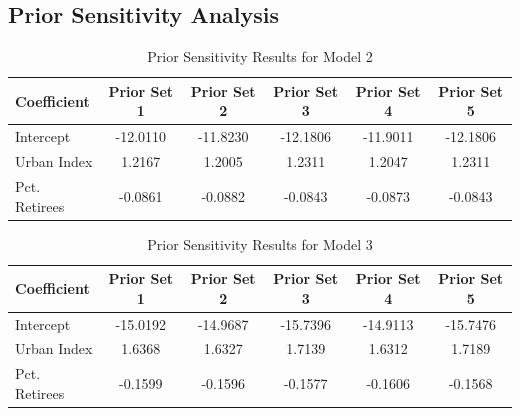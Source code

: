 \documentclass[12pt]{article}
\begin{document}
\FloatBarrier
\subsection*{Prior Sensitivity Analysis}
\begin{table}[h]
    \centering
    \begin{tabular}{l|ccccc}
        \hline
        Coefficient    & Prior Set 1 & Prior Set 2 & Prior Set 3 & Prior Set 4 & Prior Set 5 \\
        \hline
        Intercept      & -12.0110 & -11.8230 & -12.1806 & -11.9011 & -12.1806 \\
        Urban Index    & 1.2167 & 1.2005 & 1.2311 & 1.2047 & 1.2311 \\
        Pct. Retirees  & -0.0861 & -0.0882 & -0.0843 & -0.0873 & -0.0843 \\
        \hline
    \end{tabular}
    \caption{Prior Sensitivity Results for Model 2}
    \label{tab:Prior Sensitivity Results for Model 2}
\end{table}

\begin{table}[h]
    \centering
    \begin{tabular}{l|ccccc}
        \hline
        Coefficient    & Prior Set 1 & Prior Set 2 & Prior Set 3 & Prior Set 4 & Prior Set 5 \\
        \hline
        Intercept      & -15.0192 & -14.9687 & -15.7396 & -14.9113 & -15.7476 \\
        Urban Index    & 1.6368 & 1.6327 & 1.7139 & 1.6312 & 1.7189 \\
        Pct. Retirees  & -0.1599 & -0.1596 & -0.1577 & -0.1606 & -0.1568 \\
        \hline
    \end{tabular}
    \caption{Prior Sensitivity Results for Model 3}
    \label{tab:Prior Sensitivity Results for Model 3}
\end{table}






\FloatBarrier
\newpage
\printbibliography
\end{document}
